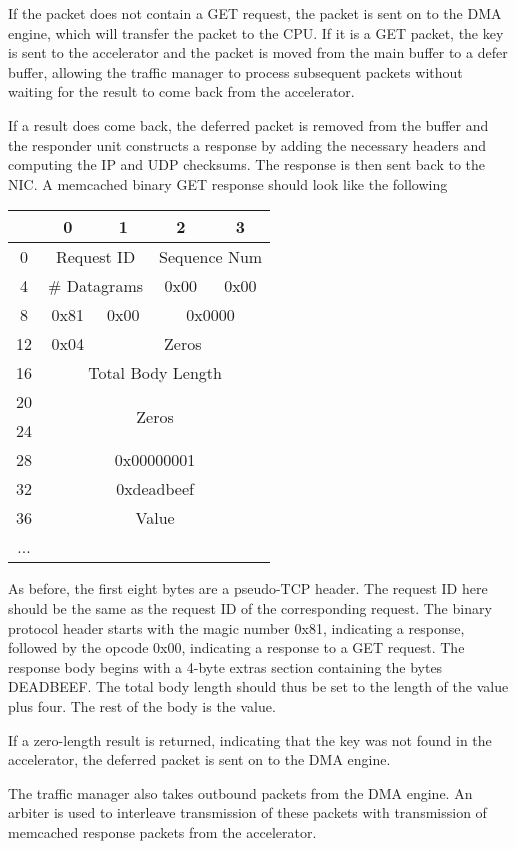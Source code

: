 If the packet does not contain a GET request, the packet
is sent on to the DMA engine, which will transfer the packet to the CPU.
If it is a GET packet, the key is sent to the accelerator and
the packet is moved from the main buffer to a defer buffer, allowing the
traffic manager to process subsequent packets without waiting for the result
to come back from the accelerator.

If a result does come back, the deferred packet is removed from the buffer and
the responder unit constructs a response by adding the necessary headers and
computing the IP and UDP checksums. The response is then sent back to the NIC.
A memcached binary GET response should look like the following

\begin{center}
    \begin{tabular}{|c|c|c|c|c|}
        \hline
          & 0 & 1 & 2 & 3 \\
        \hline
        0 & \multicolumn{2}{|c}{Request ID} & \multicolumn{2}{|c|}{Sequence Num} \\
        \hline
        4 & \multicolumn{2}{|c|}{\# Datagrams} & 0x00 & 0x00 \\
        \hline
        8 & 0x81 & 0x00 & \multicolumn{2}{c|}{0x0000} \\
        \hline
        12 & 0x04 & \multicolumn{3}{c|}{Zeros} \\
        \hline
        16 & \multicolumn{4}{|c|}{Total Body Length} \\
        \hline
        20 & \multicolumn{4}{|c|}{\multirow{2}{*}{Zeros}} \\
        \cline{1-1}
        24 & \multicolumn{4}{|c|}{} \\
        \hline
        28 & \multicolumn{4}{|c|}{0x00000001} \\
        \hline
        32 & \multicolumn{4}{|c|}{0xdeadbeef} \\
        \hline
        36 & \multicolumn{4}{|c|}{Value} \\
        ... & \multicolumn{4}{|c|}{} \\
        \hline
    \end{tabular}
\end{center}

As before, the first eight bytes are a pseudo-TCP header. The request ID here
should be the same as the request ID of the corresponding request.
The binary protocol header starts with the magic number 0x81, indicating a
response, followed by the opcode 0x00, indicating a response to a GET request.
The response body begins with a 4-byte extras section containing the bytes
DEADBEEF. The total body length should thus be set to the length of the value
plus four. The rest of the body is the value.

If a zero-length result is returned, indicating that the key was not found in
the accelerator, the deferred packet is sent on to the DMA engine.

The traffic manager also takes outbound packets from the DMA engine. An arbiter
is used to interleave transmission of these packets with transmission of
memcached response packets from the accelerator.
